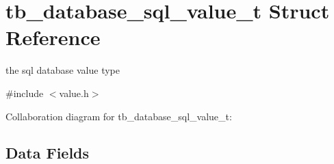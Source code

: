 \hypertarget{structtb__database__sql__value__t}{\section{tb\-\_\-database\-\_\-sql\-\_\-value\-\_\-t Struct Reference}
\label{structtb__database__sql__value__t}
}


the sql database value type  




{\ttfamily \#include $<$value.\-h$>$}



Collaboration diagram for tb\-\_\-database\-\_\-sql\-\_\-value\-\_\-t\-:
\subsection*{Data Fields}
